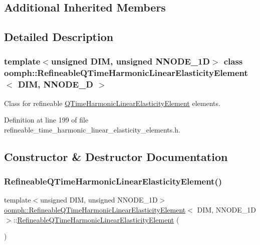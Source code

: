 \subsection*{Additional Inherited Members}


\subsection{Detailed Description}
\subsubsection*{template$<$unsigned D\+IM, unsigned N\+N\+O\+D\+E\+\_\+1D$>$\newline
class oomph\+::\+Refineable\+Q\+Time\+Harmonic\+Linear\+Elasticity\+Element$<$ D\+I\+M, N\+N\+O\+D\+E\+\_\+D $>$}

Class for refineable \hyperlink{classoomph_1_1QTimeHarmonicLinearElasticityElement}{Q\+Time\+Harmonic\+Linear\+Elasticity\+Element} elements. 

Definition at line 199 of file refineable\+\_\+time\+\_\+harmonic\+\_\+linear\+\_\+elasticity\+\_\+elements.\+h.



\subsection{Constructor \& Destructor Documentation}
\mbox{\label{classoomph_1_1RefineableQTimeHarmonicLinearElasticityElement_a4c3afda74d46ce399fc5929a5315b8b2}} 
\subsubsection{\texorpdfstring{Refineable\+Q\+Time\+Harmonic\+Linear\+Elasticity\+Element()}{RefineableQTimeHarmonicLinearElasticityElement()}}
{\footnotesize\ttfamily template$<$unsigned D\+IM, unsigned N\+N\+O\+D\+E\+\_\+1D$>$ \\
\hyperlink{classoomph_1_1RefineableQTimeHarmonicLinearElasticityElement}{oomph\+::\+Refineable\+Q\+Time\+Harmonic\+Linear\+Elasticity\+Element}$<$ D\+IM, N\+N\+O\+D\+E\+\_\+1D $>$\+::\hyperlink{classoomph_1_1RefineableQTimeHarmonicLinearElasticityElement}{Refineable\+Q\+Time\+Harmonic\+Linear\+Elasticity\+Element} (\begin{DoxyParamCaption}{ }\end{DoxyParamCaption})\hspace{0.3cm}{\ttfamily [inline]}}



